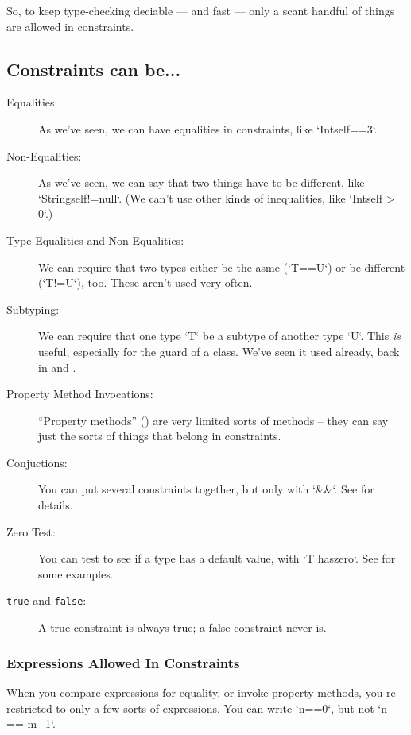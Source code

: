 So, to keep type-checking deciable --- and fast --- only a scant handful of
things are allowed in constraints.  

\subsection{Constraints can be...}

\begin{description}
\item [Equalities:] As we've seen, we can have equalities in constraints, like
      \xcd`Int{self==3}`.
\item [Non-Equalities:] As we've seen, we can say that two things have to be
      different, like \xcd`String{self!=null}`.  (We can't use other kinds of
      inequalities, like \xcd`Int{self > 0}`.)
\item [Type Equalities and Non-Equalities:] We can require that two types
      either be the asme (\xcd`T==U`) or be different (\xcd`T!=U`), too.
      These aren't used very often.
\item [Subtyping:] We can require that one type \xcd`T` be a subtype of
      another type \xcd`U`.  This {\em is} useful, especially 
      for the guard of a class. We've seen it used already, back in
       and . 
\item [Property Method Invocations:] ``Property methods''
      () are very limited sorts of methods -- they
      can say just the sorts of things that belong in constraints.
\item [Conjuctions:]  You can put several constraints together, but only with
      \xcd`&&`.  See  for details.
\item [Zero Test:] You can test to see if a type has a default value, with 
      \xcd`T haszero`.  See  for some examples.
\item [{\tt true} and {\tt false}:] A true constraint is always true; a false
      constraint never is.  
\end{description}

\subsubsection{Expressions Allowed In Constraints} 

When you compare expressions for equality, or invoke property methods, you re
restricted to only a few sorts of expressions.  You can write \xcd`n==0`, but
not \xcd`n == m+1`.

